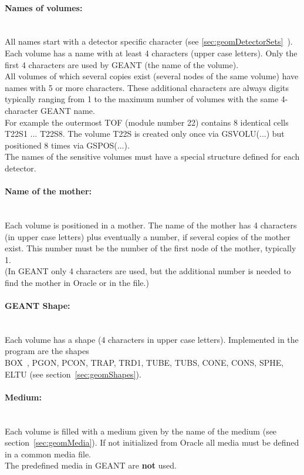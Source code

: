 \paragraph{Names of volumes:} ~\\
All names start with a detector specific character (see \ref{sec:geomDetectorSets}~). \\
Each volume has a name with at least 4 characters (upper case letters). Only the first 4 characters are used by GEANT (the 
name of the volume).\\
All volumes of which several copies exist (several nodes of the same volume) have names with 5 or more characters. These 
additional characters are always digits typically ranging from 1 to the maximum number of volumes with the same 
4-character GEANT name.\\
For example the outermost TOF (module number 22) contains 8 identical cells T22S1 ... T22S8. The volume T22S is created 
only once via GSVOLU(...) but positioned 8 times via GSPOS(...).\\
The names of the sensitive volumes must have a special structure defined for each detector.

\paragraph{Name of the mother:} ~\\
Each volume is positioned in a mother. The name of the mother has 4 characters (in upper case letters) plus eventually a 
number, if several copies of the mother exist. This number must be the number of the first node of the mother, typically 1.\\ 
(In GEANT only 4 characters are used, but the additional number is needed to find the mother in Oracle or in the file.)

\paragraph{GEANT Shape:} ~\\
Each volume has a shape (4 characters in upper case letters). Implemented in the program are the shapes \\
BOX~, PGON, PCON, TRAP, TRD1, TUBE, TUBS, CONE, CONS, SPHE, ELTU (see section~\ref{sec:geomShapes}).

\paragraph{Medium:} ~\\
Each volume is filled with a medium given by the name of the medium (see section~\ref{sec:geomMedia}). If not initialized 
from Oracle all media must be defined in a common media file.\\
The predefined media in GEANT are \textbf{not} used.

